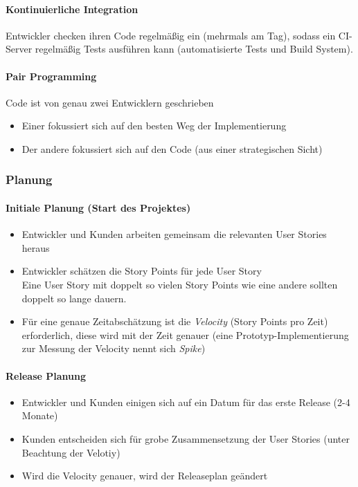 \documentclass[
    ngerman,
    color=3b,
    summary,
    boxarc,
    main,
]{rubos-tuda-template}
\begin{document}
\paragraph{Kontinuierliche Integration}
Entwickler checken ihren Code regelmäßig ein (mehrmals am Tag), sodass ein CI-Server regelmäßig Tests ausführen kann (automatisierte Tests und Build System).

\paragraph{Pair Programming}
Code ist von genau zwei Entwicklern geschrieben
\begin{itemize}
    \item Einer fokussiert sich auf den besten Weg der Implementierung
    \item Der andere fokussiert sich auf den Code (aus einer strategischen Sicht)
\end{itemize}

\subsubsection{Planung}
\paragraph{Initiale Planung (Start des Projektes)}
\begin{itemize}
    \item Entwickler und Kunden arbeiten gemeinsam die relevanten User Stories heraus
    \item Entwickler schätzen die Story Points für jede User Story \\
          {\small Eine User Story mit doppelt so vielen Story Points wie eine andere sollten doppelt so lange dauern.}
    \item Für eine genaue Zeitabschätzung ist die \textit{Velocity} (Story Points pro Zeit) erforderlich, diese wird mit der Zeit genauer (eine Prototyp-Implementierung zur Messung der Velocity nennt sich \textit{Spike})
\end{itemize}

\paragraph{Release Planung}
\begin{itemize}
    \item Entwickler und Kunden einigen sich auf ein Datum für das erste Release (2-4 Monate)
    \item Kunden entscheiden sich für grobe Zusammensetzung der User Stories (unter Beachtung der Velotiy)
    \item Wird die Velocity genauer, wird der Releaseplan geändert
\end{itemize}
\end{document}
